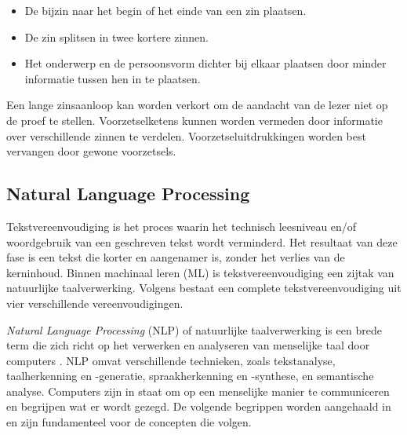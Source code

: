 \begin{itemize}
	\item De bijzin naar het begin of het einde van een zin plaatsen.
	\item De zin splitsen in twee kortere zinnen.
	\item Het onderwerp en de persoonsvorm dichter bij elkaar plaatsen door minder informatie tussen hen in te plaatsen.
\end{itemize}


Een lange zinsaanloop kan worden verkort om de aandacht van de lezer niet op de proef te stellen. Voorzetselketens kunnen worden vermeden door informatie over verschillende zinnen te verdelen. Voorzetseluitdrukkingen worden best vervangen door gewone voorzetsels.



\subsection{Natural Language Processing}


Tekstvereenvoudiging is het proces waarin het technisch leesniveau en/of woordgebruik van een geschreven tekst wordt verminderd. Het resultaat van deze fase is een tekst die korter en aangenamer is, zonder het verlies van de kerninhoud. Binnen machinaal leren (ML) is tekstvereenvoudiging een zijtak van natuurlijke taalverwerking. \autocite{Siddharthan2006} Volgens \autocite{Siddharthan2014} bestaat een complete tekstvereenvoudiging uit vier verschillende vereenvoudigingen. %

\textit{Natural Language Processing} (NLP) of natuurlijke taalverwerking is een brede term die zich richt op het verwerken en analyseren van menselijke taal door computers \autocite{Eisenstein2019}. NLP omvat verschillende technieken, zoals tekstanalyse, taalherkenning en -generatie, spraakherkenning en -synthese, en semantische analyse. Computers zijn in staat om op een menselijke manier te communiceren en begrijpen wat er wordt gezegd. De volgende begrippen worden aangehaald in \textcite{Sohom2019, Eisenstein2019} en zijn fundamenteel voor de concepten die volgen.

